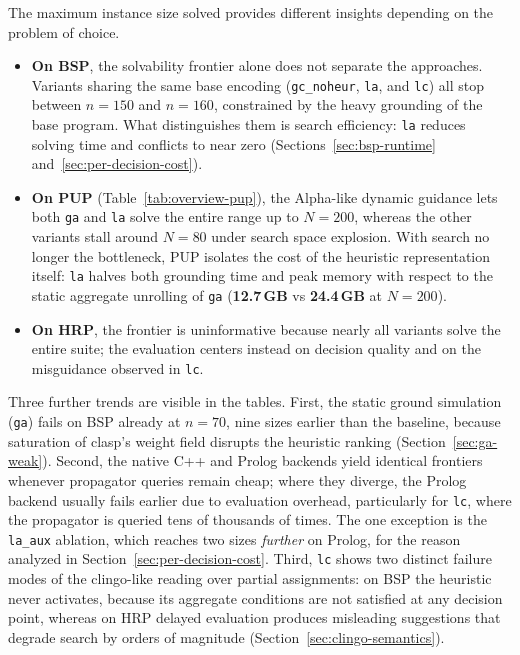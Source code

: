 The maximum instance size solved provides different insights depending on the problem of choice.
\begin{itemize}
    \item \textbf{On BSP}, the solvability frontier alone does not separate the approaches. Variants sharing the same base encoding (\texttt{gc\_noheur}, \texttt{la}, and \texttt{lc}) all stop between $n=150$ and $n=160$, constrained by the heavy grounding of the base program. What distinguishes them is search efficiency: \texttt{la} reduces solving time and conflicts to near zero (Sections~\ref{sec:bsp-runtime} and~\ref{sec:per-decision-cost}).
    \item \textbf{On PUP} (Table~\ref{tab:overview-pup}), the Alpha-like dynamic guidance lets both \texttt{ga} and \texttt{la} solve the entire range up to $N=200$, whereas the other variants stall around $N=80$ under search space explosion. With search no longer the bottleneck, PUP isolates the cost of the heuristic representation itself: \texttt{la} halves both grounding time and peak memory with respect to the static aggregate unrolling of \texttt{ga} (\textbf{12.7\,GB} vs \textbf{24.4\,GB} at $N=200$).
    \item \textbf{On HRP}, the frontier is uninformative because nearly all variants solve the entire suite; the evaluation centers instead on decision quality and on the misguidance observed in \texttt{lc}.
\end{itemize}

Three further trends are visible in the tables. First, the static ground simulation (\texttt{ga}) fails on BSP already at $n=70$, nine sizes earlier than the baseline, because saturation of clasp's weight field disrupts the heuristic ranking (Section~\ref{sec:ga-weak}). Second, the native C++ and Prolog backends yield identical frontiers whenever propagator queries remain cheap; where they diverge, the Prolog backend usually fails earlier due to evaluation overhead, particularly for \texttt{lc}, where the propagator is queried tens of thousands of times. The one exception is the \texttt{la\_aux} ablation, which reaches two sizes \emph{further} on Prolog, for the reason analyzed in Section~\ref{sec:per-decision-cost}. Third, \texttt{lc} shows two distinct failure modes of the clingo-like reading over partial assignments: on BSP the heuristic never activates, because its aggregate conditions are not satisfied at any decision point, whereas on HRP delayed evaluation produces misleading suggestions that degrade search by orders of magnitude (Section~\ref{sec:clingo-semantics}).


